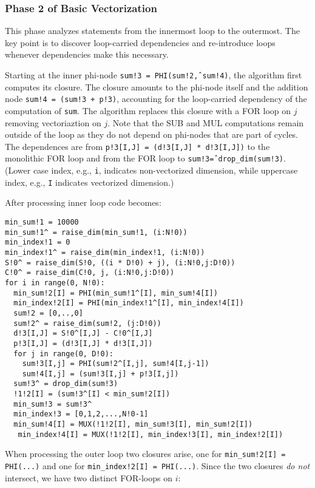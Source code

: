 \subsubsection{Phase 2 of Basic Vectorization}

This phase analyzes statements from the innermost loop to the outermost. The key point is to discover loop-carried dependencies and re-introduce loops whenever dependencies make this necessary.

Starting at the inner phi-node \texttt{sum!3 = PHI(sum!2\^, sum!4)}, the algorithm first computes its closure. The closure amounts to the phi-node itself and the addition node \texttt{sum!4 = (sum!3 + p!3)}, accounting for the loop-carried dependency of the computation of \texttt{sum}. The algorithm replaces this closure with a FOR loop on $j$ removing vectoriaztion on $j$. Note that the SUB and MUL computations remain outside of the loop as they do not depend on phi-nodes that are part of cycles. The dependences are from \texttt{p!3[I,J] = (d!3[I,J] * d!3[I,J])} to the monolithic FOR loop and from the FOR loop to \texttt{sum!3\^ = drop\_dim(sum!3)}. (Lower case index, e.g., \texttt{i}, indicates non-vectorized dimension, while uppercase index, e.g., \texttt{I} indicates vectorized dimension.)

After processing inner loop code becomes:

{\small
\begin{verbatim}
min_sum!1 = 10000
min_sum!1^ = raise_dim(min_sum!1, (i:N!0))
min_index!1 = 0
min_index!1^ = raise_dim(min_index!1, (i:N!0))
S!0^ = raise_dim(S!0, ((i * D!0) + j), (i:N!0,j:D!0))
C!0^ = raise_dim(C!0, j, (i:N!0,j:D!0))
for i in range(0, N!0):
  min_sum!2[I] = PHI(min_sum!1^[I], min_sum!4[I]) 
  min_index!2[I] = PHI(min_index!1^[I], min_index!4[I])  
  sum!2 = [0,..,0] 
  sum!2^ = raise_dim(sum!2, (j:D!0))
  d!3[I,J] = S!0^[I,J] - C!0^[I,J]
  p!3[I,J] = (d!3[I,J] * d!3[I,J])
  for j in range(0, D!0):
    sum!3[I,j] = PHI(sum!2^[I,j], sum!4[I,j-1])       
    sum!4[I,j] = (sum!3[I,j] + p!3[I,j])
  sum!3^ = drop_dim(sum!3)     
  !1!2[I] = (sum!3^[I] < min_sum!2[I])
  min_sum!3 = sum!3^
  min_index!3 = [0,1,2,...,N!0-1]
  min_sum!4[I] = MUX(!1!2[I], min_sum!3[I], min_sum!2[I])
   min_index!4[I] = MUX(!1!2[I], min_index!3[I], min_index!2[I])
\end{verbatim}
}

When processing the outer loop two closures arise, one for \texttt{min\_sum!2[I] = PHI(...)} and one 
for \texttt{min\_index!2[I] = PHI(...)}. Since the two closures \emph{do not} intersect, we have two distinct FOR-loops on $i$:

